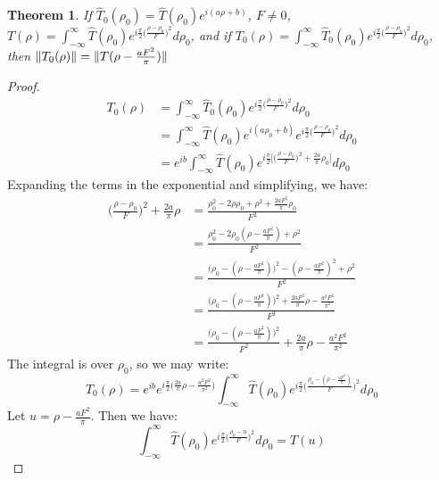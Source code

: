 \documentclass[oneside]{book}
\theoremstyle{mystyle}
\newtheorem{theorem}{Theorem}[section]
\DeclarePairedDelimiter\norm{\lVert}{\rVert}
\begin{document}
\begin{theorem}
If $\hat{T}_0(\rho_0) = \hat{T}(\rho_0)e^{i(a\rho+b)}$, $F\ne 0$, $T(\rho) = \int_{-\infty}^{\infty}\hat{T}(\rho_0)e^{i\frac{\pi}{2}\big(\frac{\rho-\rho_0}{F}\big)^2} d\rho_0$, and if $T_{0}(\rho) = \int_{-\infty}^{\infty}\hat{T}_{0}(\rho_0)e^{i\frac{\pi}{2}\big(\frac{\rho-\rho_0}{F}\big)^2} d\rho_0$, then $\norm{T_{0}(\rho)} = \norm{T(\rho - \frac{aF^2}{\pi})}$
\end{theorem}
\begin{proof}
\begin{align*}
T_0(\rho) &= \int_{-\infty}^{\infty} \hat{T}_{0}(\rho_0)e^{i\frac{\pi}{2}\big(\frac{\rho-\rho_0}{F}\big)^2}d\rho_0\\
&=\int_{-\infty}^{\infty} \hat{T}(\rho_0)e^{i(a\rho_0+b)}e^{i\frac{\pi}{2}\big(\frac{\rho - \rho_0}{F}\big)^2}d\rho_0 \\
	&= e^{ib}\int_{-\infty}^{\infty}\hat{T}(\rho_0)e^{i\frac{\pi}{2}\bigg[\big(\frac{\rho-\rho_0}{F}\big)^2 + \frac{2a}{\pi}\rho_0\bigg]}d\rho_0
\end{align*}
Expanding the terms in the exponential and simplifying, we have:
\begin{align*}
    \big(\frac{\rho-\rho_0}{F}\big)^2 + \frac{2a}{\pi}\rho &= \frac{\rho_0^2 - 2\rho\rho_0 + \rho^2 + \frac{2aF^2}{\pi}\rho_0}{F^2}\\
    &= \frac{\rho_0^2 - 2\rho_0(\rho - \frac{aF^2}{\pi}) + \rho^2}{F^2}\\
    &= \frac{\big(\rho_0 - (\rho - \frac{aF^2}{\pi})\big)^2 - (\rho - \frac{aF^2}{\pi})^2 + \rho^2}{F^2}\\
    &= \frac{\big(\rho_0 - (\rho-\frac{aF^2}{\pi})\big)^2 +\frac{2aF^2}{\pi}\rho - \frac{a^2F^4}{\pi^2}}{F^2}\\
    &= \frac{\big(\rho_0 - (\rho-\frac{aF^2}{\pi})\big)^2}{F^2} + \frac{2a}{\pi}\rho - \frac{a^2F^2}{\pi^2}
\end{align*}
The integral is over $\rho_0$, so we may write:
\begin{equation*}
T_0(\rho) = e^{ib}e^{i\frac{\pi}{2}\big(\frac{2a}{\pi}\rho - \frac{a^2F^2}{\pi^2}\big)}\int_{-\infty}^{\infty} \hat{T}(\rho_0)e^{i\frac{\pi}{2}\big(\frac{\rho_0 - (\rho - \frac{aF^2}{\pi})}{F}\big)^2}d\rho_0
\end{equation*}
Let $u = \rho - \frac{aF^2}{\pi}$. Then we have:
\begin{equation*}
\int_{-\infty}^{\infty} \hat{T}(\rho_0)e^{i\frac{\pi}{2}\big(\frac{\rho_0 - u}{F}\big)^2}d\rho_0 = T(u)
\end{equation*}

\end{proof}
\end{document}
